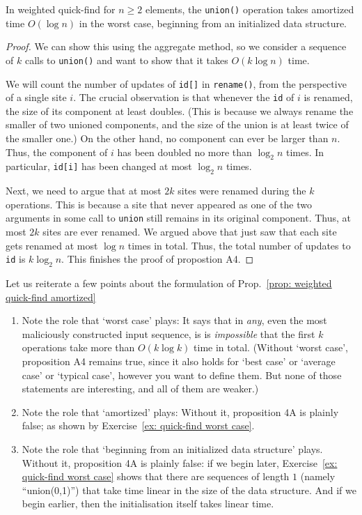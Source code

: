\documentclass{tstextbook}
\begin{document}
\begin{theorem}\label{prop: weighted quick-find amortized}
  In weighted quick-find for $n\geq 2$ elements, the {\tt union()} operation takes amortized time $O(\log n)$ in the worst case, beginning from an initialized data structure.
\end{theorem}

\begin{proof}
We can show this using the aggregate method, so we consider a sequence of $k$ calls to {\tt union()} and want to show that it takes $O(k\log n)$ time.

We will count the number of updates of {\tt id[]} in {\tt rename()}, from the perspective of a single site $i$. 
The crucial observation is that whenever the {\tt id} of $i$ is renamed, the size of its component at least doubles.
(This is because we always rename the smaller of two unioned components, and the size of the union is at least twice of the smaller one.)
On the other hand, no component can ever be larger than $n$. 
Thus, the component of $i$ has been doubled no more than $\log_2 n$ times.
In particular, {\tt id[i]} has been changed at most $\log_2 n$ times.

Next, we need to argue that at most $2k$ sites were renamed during the $k$ operations.
This is because a site that never appeared as one of the two arguments in some call to {\tt union} still remains in its original component.
Thus, at most $2k$ sites are ever renamed.
We argued above that just saw that each site gets renamed at most $\log n$ times in total.
Thus, the total number of updates to {\tt id} is $k\log_2 n$. 
This finishes the proof of propostion A4.
\end{proof}

Let us reiterate a few points about the formulation of Prop.~\ref{prop: weighted quick-find amortized}
\begin{enumerate}
  \item  Note the role that `worst case' plays:
    It says that in \emph{any}, even the most maliciously constructed input sequence, is is \emph{impossible} that the first $k$ operations take more than $O(k\log k)$ time in total.
    (Without `worst case', proposition A4 remains true, since it also holds for `best case' or `average case' or `typical case', however you want to define them.
    But none of those statements are interesting, and all of them are weaker.)
\item Note the role that `amortized' plays:
  Without it, proposition 4A is plainly false; as shown by Exercise~\ref{ex: quick-find worst case}.
\item Note the role that `beginning from an initialized data structure' plays. 
  Without it, proposition 4A is plainly false: if we begin later, Exercise~\ref{ex: quick-find worst case} shows that there are sequences of length $1$ (namely ``union(0,1)'') that take time linear in the size of the data structure.
    And if we begin earlier, then the initialisation itself takes linear time.
\end{enumerate}
\end{document}

